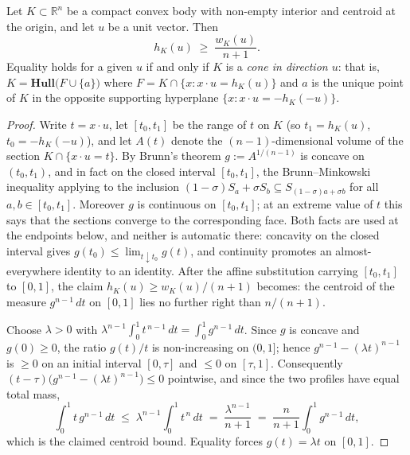 \documentclass[10pt,a4paper]{amsart}
\newcommand{\Hull}{\mathbf{Hull}}
\newcommand{\R}{\mathbb{R}}
\begin{document}
\begin{lemma}\label{lem:mr}
Let $K\subset\R^n$ be a compact convex body with non-empty interior and
centroid at the origin, and let $u$ be a unit vector.  Then
\[
h_K(u) \;\ge\; \frac{w_K(u)}{n+1}.
\]
Equality holds for a given $u$ if and only if $K$ is a {\em cone in
direction $u$}: that is, $K=\Hull\bigl(F\cup\{a\}\bigr)$ where
$F = K\cap\{x : x\cdot u = h_K(u)\}$ and $a$ is the unique point of $K$
in the opposite supporting hyperplane $\{x : x\cdot u = -h_K(-u)\}$.
\end{lemma}

\begin{proof}
Write $t = x\cdot u$, let $[t_0,t_1]$ be the range of $t$ on $K$ (so
$t_1=h_K(u)$, $t_0=-h_K(-u)$), and let $A(t)$ denote the
$(n-1)$-dimensional volume of the section $K\cap\{x\cdot u = t\}$.  By
Brunn's theorem $g:=A^{1/(n-1)}$ is concave on $(t_0,t_1)$, and in fact on
the closed interval $[t_0,t_1]$, the Brunn--Minkowski inequality applying to
the inclusion $(1-\sigma)S_a+\sigma S_b\subseteq S_{(1-\sigma)a+\sigma b}$
for all $a,b\in[t_0,t_1]$.  Moreover $g$ is continuous on $[t_0,t_1]$; at an
extreme value of $t$ this says that the sections converge to the
corresponding face.  Both facts are used at the endpoints below, and neither
is automatic there: concavity on the closed interval gives
$g(t_0)\le\lim_{t\downarrow t_0}g(t)$, and continuity promotes an
almost-everywhere identity to an identity.  After the
affine substitution carrying $[t_0,t_1]$ to $[0,1]$, the claim
$h_K(u)\ge w_K(u)/(n+1)$ becomes: the centroid of the measure
$g^{n-1}\,dt$ on $[0,1]$ lies no further right than $n/(n+1)$.

Choose $\lambda>0$ with
$\lambda^{n-1}\int_0^1 t^{\,n-1}\,dt=\int_0^1 g^{n-1}\,dt$.  Since $g$ is
concave and $g(0)\ge 0$, the ratio $g(t)/t$ is non-increasing on
$(0,1]$; hence $g^{n-1}-(\lambda t)^{n-1}$ is $\ge 0$ on an initial
interval $[0,\tau]$ and $\le 0$ on $[\tau,1]$.  Consequently
$(t-\tau)\bigl(g^{n-1}-(\lambda t)^{n-1}\bigr)\le 0$ pointwise, and since
the two profiles have equal total mass,
\[
\int_0^1 t\,g^{n-1}\,dt \;\le\; \lambda^{n-1}\!\int_0^1 t^{\,n}\,dt
\;=\;\frac{\lambda^{n-1}}{n+1}
\;=\;\frac{n}{n+1}\int_0^1 g^{n-1}\,dt ,
\]
which is the claimed centroid bound.  Equality forces
$g(t)=\lambda t$ on $[0,1]$.


\end{proof}
\end{document}
